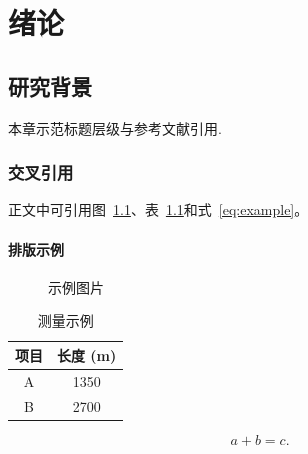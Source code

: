 \chapter{绪论}
\section{研究背景}
本章示范标题层级与参考文献引用\cite{knuth1984}.
\subsection{交叉引用}
正文中可引用图~\ref{fig:example}、表~\ref{tab:example}和式~\eqref{eq:example}。
\subsubsection{排版示例}
\begin{figure}[htbp]
  \centering
  \fbox{\rule{0pt}{25mm}\rule{.45\linewidth}{0pt}}
  \caption{示例图片}
  \label{fig:example}
\end{figure}
\begin{table}[htbp]
  \caption{测量示例}
  \label{tab:example}
  \centering
  \begin{tabular}{cc}
    \hline
    项目 & 长度 (\unit{\metre}) \\
    \hline
    A & \num{1350} \\
    B & \num{2700} \\
    \hline
  \end{tabular}
\end{table}
\begin{equation}
  \label{eq:example}
  a + b = c .
\end{equation}
